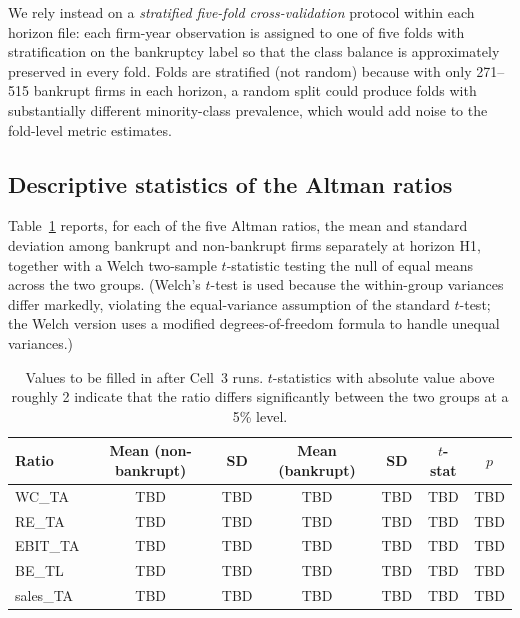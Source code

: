 \documentclass[11pt,a4paper]{article}
\begin{document}
We rely instead on a \textit{stratified five-fold cross-validation}
protocol within each horizon file: each firm-year observation is assigned
to one of five folds with stratification on the bankruptcy label so that the
class balance is approximately preserved in every fold. Folds are stratified
(not random) because with only 271--515 bankrupt firms in each horizon, a
random split could produce folds with substantially different minority-class
prevalence, which would add noise to the fold-level metric estimates.

\subsection{Descriptive statistics of the Altman ratios}
\label{sec:descriptives}

Table~\ref{tab:descriptives} reports, for each of the five Altman ratios,
the mean and standard deviation among bankrupt and non-bankrupt firms
separately at horizon H1, together with a Welch two-sample $t$-statistic
testing the null of equal means across the two groups. (Welch's $t$-test is
used because the within-group variances differ markedly, violating the
equal-variance assumption of the standard $t$-test; the Welch version uses
a modified degrees-of-freedom formula to handle unequal variances.)

\begin{table}[ht]
\centering
\caption{Altman ratio means by bankruptcy status, horizon H1. Welch's
$t$-statistic tests equality of means between the bankrupt and non-bankrupt
groups; a large absolute $t$ indicates that the ratio differs materially
between groups and is therefore a candidate for inclusion in a bankruptcy
model.}
\label{tab:descriptives}
\begin{tabular}{lcccccc}
\toprule
Ratio & Mean (non-bankrupt) & SD & Mean (bankrupt) & SD & $t$-stat & $p$ \\
\midrule
WC\_TA       & TBD & TBD & TBD & TBD & TBD & TBD \\
RE\_TA       & TBD & TBD & TBD & TBD & TBD & TBD \\
EBIT\_TA     & TBD & TBD & TBD & TBD & TBD & TBD \\
BE\_TL       & TBD & TBD & TBD & TBD & TBD & TBD \\
sales\_TA    & TBD & TBD & TBD & TBD & TBD & TBD \\
\bottomrule
\end{tabular}
\caption*{\footnotesize Values to be filled in after Cell~3 runs.
$t$-statistics with absolute value above roughly 2 indicate that the ratio
differs significantly between the two groups at a 5\% level.}
\end{table}
\end{document}
